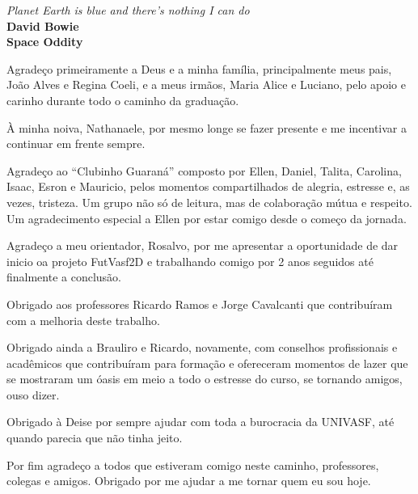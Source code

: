 \newpage
\begin{epigrafe}
\vspace*{\fill}
\begin{flushright}
		\textit{Planet Earth is blue and there's nothing I can do}\\
		\textbf{David Bowie}\\
		\textbf{Space Oddity}
\end{flushright}
\end{epigrafe}
\begin{agradecimentos}
	
Agradeço primeiramente a Deus e a minha família, principalmente meus pais, João
Alves e Regina Coeli, e a meus irmãos, Maria Alice e Luciano, pelo apoio e carinho
durante todo o caminho da graduação.

À minha noiva, Nathanaele, por mesmo longe se fazer presente e me incentivar a
continuar em frente sempre.

Agradeço ao ``Clubinho Guaraná'' composto por Ellen, Daniel, Talita, Carolina,
Isaac, Esron e Mauricio, pelos momentos compartilhados de alegria, estresse e,
as vezes, tristeza. Um grupo não só de leitura, mas de colaboração mútua e
respeito. Um agradecimento especial a Ellen por estar comigo desde o começo da
jornada.

Agradeço a meu orientador, Rosalvo, por me apresentar a oportunidade de dar
inicio oa projeto FutVasf2D e trabalhando comigo por 2 anos seguidos até
finalmente a conclusão.

Obrigado aos professores Ricardo Ramos e Jorge Cavalcanti que contribuíram com a
melhoria deste trabalho.

Obrigado ainda a Brauliro e Ricardo, novamente, com conselhos profissionais e
acadêmicos que contribuíram para formação e ofereceram momentos de lazer que se mostraram
um óasis em meio a todo o estresse do curso, se tornando amigos, ouso dizer.

Obrigado à Deise por sempre ajudar com toda a burocracia da UNIVASF, até quando
parecia que não tinha jeito.

Por fim agradeço a todos que estiveram comigo neste caminho, professores,
colegas e amigos. Obrigado por me ajudar a me tornar quem eu sou hoje.

\end{agradecimentos}

